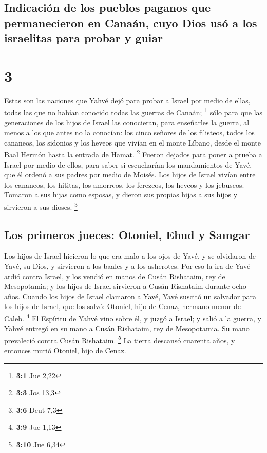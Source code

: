 \begin{paracol}{2}
{\subsection{Indicación de los pueblos paganos que permanecieron en
Canaán, cuyo Dios usó a los israelitas para probar y
guiar}\label{indicaciuxf3n-de-los-pueblos-paganos-que-permanecieron-en-canauxe1n-cuyo-dios-usuxf3-a-los-israelitas-para-probar-y-guiar}}

\hypertarget{section-4}{%
\section{3}\label{section-4}}

 Estas son las naciones que Yahvé dejó para probar a
Israel por medio de ellas, todas las que no habían conocido todas las
guerras de Canaán; \footnote{\textbf{3:1} Jue 2,22}  sólo
para que las generaciones de los hijos de Israel las conocieran, para
enseñarles la guerra, al menos a los que antes no la conocían:
 los cinco señores de los filisteos, todos los cananeos,
los sidonios y los heveos que vivían en el monte Líbano, desde el monte
Baal Hermón hasta la entrada de Hamat. \footnote{\textbf{3:3} Jos 13,3}
 Fueron dejados para poner a prueba a Israel por medio de
ellos, para saber si escucharían los mandamientos de Yavé, que él ordenó
a sus padres por medio de Moisés.  Los hijos de Israel
vivían entre los cananeos, los hititas, los amorreos, los ferezeos, los
heveos y los jebuseos.  Tomaron a sus hijas como esposas,
y dieron sus propias hijas a sus hijos y sirvieron a sus dioses.
\footnote{\textbf{3:6} Deut 7,3}

\hypertarget{los-primeros-jueces-otoniel-ehud-y-samgar}{%
\subsection{Los primeros jueces: Otoniel, Ehud y
Samgar}\label{los-primeros-jueces-otoniel-ehud-y-samgar}}

 Los hijos de Israel hicieron lo que era malo a los ojos
de Yavé, y se olvidaron de Yavé, su Dios, y sirvieron a los baales y a
los asherotes.  Por eso la ira de Yavé ardió contra
Israel, y los vendió en manos de Cusán Rishataim, rey de Mesopotamia; y
los hijos de Israel sirvieron a Cusán Rishataim durante ocho años.
 Cuando los hijos de Israel clamaron a Yavé, Yavé suscitó
un salvador para los hijos de Israel, que los salvó: Otoniel, hijo de
Cenaz, hermano menor de Caleb. \footnote{\textbf{3:9} Jue 1,13}
 El Espíritu de Yahvé vino sobre él, y juzgó a Israel; y
salió a la guerra, y Yahvé entregó en su mano a Cusán Rishataim, rey de
Mesopotamia. Su mano prevaleció contra Cusán Rishataim. \footnote{\textbf{3:10}
  Jue 6,34}  La tierra descansó cuarenta años, y entonces
murió Otoniel, hijo de Cenaz.


\end{paracol}
